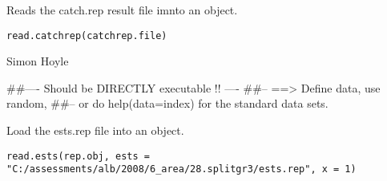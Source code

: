 \documentclass[a4paper]{book}
\begin{document}
%
\begin{Description}\relax

Reads the catch.rep result file imnto an object. 
\end{Description}
%
\begin{Usage}
\begin{verbatim}
read.catchrep(catchrep.file)
\end{verbatim}
\end{Usage}
%
\begin{Arguments}
\begin{ldescription}
\item[\code{catchrep.file}] 


\end{ldescription}
\end{Arguments}
%
\begin{Author}\relax

Simon Hoyle
\end{Author}
%
\begin{Examples}
\begin{ExampleCode}
##---- Should be DIRECTLY executable !! ----
##-- ==>  Define data, use random,
##--	or do  help(data=index)  for the standard data sets.

\end{ExampleCode}
\end{Examples}
%
\begin{Description}\relax

Load the ests.rep file into an object. 
\end{Description}
%
\begin{Usage}
\begin{verbatim}
read.ests(rep.obj, ests = "C:/assessments/alb/2008/6_area/28.splitgr3/ests.rep", x = 1)
\end{verbatim}
\end{Usage}
%
\begin{Arguments}
\begin{ldescription}
\item[\code{rep.obj}] 


\item[\code{ests}] 


\item[\code{x}] 


\end{ldescription}
\end{Arguments}
\end{document}
